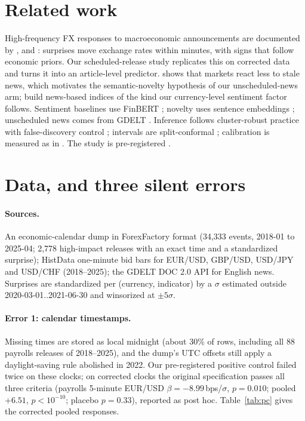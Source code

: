 \documentclass[11pt]{article}
\newcommand{\bps}{\,bps}   %
\begin{document}
\section{Related work}
High-frequency FX responses to macroeconomic announcements are documented by
\citet{abdv2003}, \citet{faust2007} and \citet{evanslyons2008}: surprises move exchange rates
within minutes, with signs that follow economic priors. Our scheduled-release study replicates
this on corrected data and turns it into an article-level predictor. \citet{tetlock2011} shows
that markets react less to stale news, which motivates the semantic-novelty hypothesis of our
unscheduled-news arm; \citet{bbd2016} build news-based indices of the kind our currency-level
sentiment factor follows. Sentiment baselines use FinBERT \citep{araci2019}; novelty uses
sentence embeddings \citep{reimers2019}; unscheduled news comes from GDELT \citep{leetaru2013}.
Inference follows cluster-robust practice \citep{cameronmiller2015} with false-discovery control
\citep{bh1995}; intervals are split-conformal \citep{lei2018}; calibration is measured as in
\citet{guo2017}. The study is pre-registered \citep{nosek2018}.

\section{Data, and three silent errors}\label{sec:data}

\paragraph{Sources.} An economic-calendar dump in ForexFactory format (34,333 events,
2018-01 to 2025-04; 2,778 high-impact releases with an exact time and a standardized surprise);
HistData one-minute bid bars for EUR/USD, GBP/USD, USD/JPY and USD/CHF (2018--2025); the GDELT
DOC 2.0 API for English news. Surprises are standardized per (currency, indicator) by a $\sigma$
estimated outside 2020-03-01..2021-06-30 and winsorized at $\pm5\sigma$.

\paragraph{Error 1: calendar timestamps.} Missing times are stored as local midnight (about 30\%
of rows, including all 88 payrolls releases of 2018--2025), and the dump's UTC offsets still
apply a daylight-saving rule abolished in 2022. Our pre-registered positive control failed twice
on these clocks; on corrected clocks the original specification passes all three criteria
(payrolls 5-minute EUR/USD $\beta=-8.99$\bps/$\sigma$, $p=0.010$; pooled $+6.51$, $p<10^{-10}$;
placebo $p=0.33$), reported as post hoc. Table~\ref{tab:pc} gives the corrected pooled responses.
\end{document}
